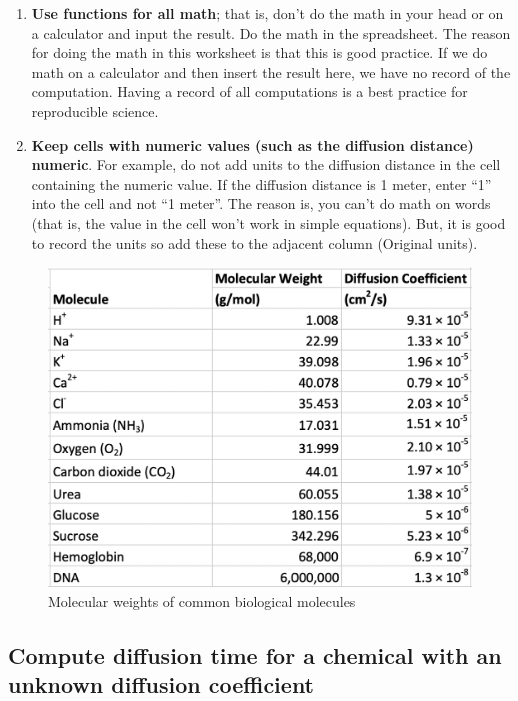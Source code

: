 \documentclass[]{book}
\begin{document}
\begin{enumerate}
\def\labelenumi{\arabic{enumi}.}
\item
  \textbf{Use functions for all math}; that is, don't do the math in
  your head or on a calculator and input the result. Do the math in the
  spreadsheet. The reason for doing the math in this worksheet is that
  this is good practice. If we do math on a calculator and then insert
  the result here, we have no record of the computation. Having a record
  of all computations is a best practice for reproducible science.
\item
  \textbf{Keep cells with numeric values (such as the diffusion
  distance) numeric}. For example, do not add units to the diffusion
  distance in the cell containing the numeric value. If the diffusion
  distance is 1 meter, enter ``1'' into the cell and not ``1 meter''.
  The reason is, you can't do math on words (that is, the value in the
  cell won't work in simple equations). But, it is good to record the
  units so add these to the adjacent column (Original units).
\end{enumerate}

\begin{figure}

{\centering \includegraphics[width=0.6\linewidth]{images/molecular_weights} 

}

\caption{Molecular weights of common biological molecules}\label{fig:diffusion-molecular-weights-table}
\end{figure}

\subsection{Compute diffusion time for a chemical with an unknown
diffusion
coefficient}\label{compute-diffusion-time-for-a-chemical-with-an-unknown-diffusion-coefficient}
\end{document}
